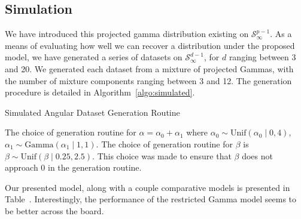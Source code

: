 \subsection{Simulation}
We have introduced this projected gamma distribution existing on $\mathcal{S}_{\infty}^{p-1}$.  As a
  means of evaluating how well we can recover a distribution under the proposed model, we have
  generated a series of datasets on $\mathcal{S}_{\infty}^{d-1}$, for $d$ ranging between 3 and 20.
  We generated each dataset from a mixture of projected Gammas, with the number of mixture components
  ranging between 3 and 12.  The generation procedure is detailed in Algorithm~\ref{algo:simulated}.
  \begin{algorithm}[H]
    \label{algo:simulated}
    \caption{Simulated Angular Dataset Generation Routine}
  \end{algorithm}
  The choice of generation routine for $\alpha = \alpha_0 + \alpha_1$ where
  $\alpha_0 \sim \text{Unif}(\alpha_0\mid 0,4)$, $\alpha_1\sim \text{Gamma}(\alpha_1\mid 1,1)$.
  The choice of generation routine for $\beta$ is $\beta\sim\text{Unif}(\beta\mid 0.25, 2.5)$.
  This choice was made to ensure that $\beta$ does not approach 0 in the generation routine.

Our presented model, along with a couple comparative models is presented in Table~.
  Interestingly, the performance of the restricted Gamma model seems to be better across the board.








